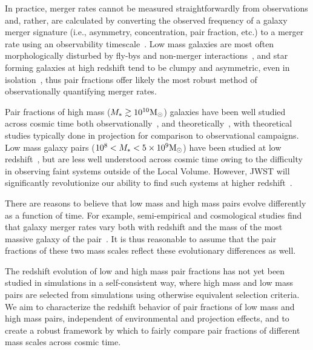 \documentclass[twocolumn]{aastex631}
\begin{document}
    In practice, merger rates cannot be measured straightforwardly from observations and, rather, are calculated by converting the observed frequency of a galaxy merger signature (i.e., asymmetry, concentration, pair fraction, etc.) to a merger rate using an observability timescale~\citep[e.g.][]{lotz11}. 
    Low mass galaxies are most often morphologically disturbed by fly-bys and non-merger interactions~\citep{Martin2021}, and star forming galaxies at high redshift tend to be clumpy and asymmetric, even in isolation~\citep{Wuyts2013}, thus pair fractions offer likely the most robust method of observationally quantifying merger rates. 

    Pair fractions of high mass ($M_*\gtrsim10^{10}\mathrm{M}_\odot$) galaxies have been well studied across cosmic time both observationally~\citep[e.g.][]{Patton2000,lotz11,Ferreras2014, Man2016,Duncan2019}, and theoretically~\citep[e.g.][]{rg15,snyder2017,snyder2023}, with theoretical studies typically done in projection for comparison to observational campaigns. 
    Low mass galaxy pairs ($10^8<M_*<5\times10^9\mathrm{M}_\odot$) have been studied at low redshift~\citep[e.g.][]{stierwalt15,pearson16,Besla2018,Paudel2018,Luber2022},
    but are less well understood across cosmic time owing to the difficulty in observing faint systems outside of the Local Volume. 
    However, JWST will significantly revolutionize our ability to find such systems at higher redshift~\citep{Behroozi2020}.
    
    There are reasons to believe that low mass and high mass pairs evolve differently as a function of time.
    For example, semi-empirical and cosmological studies find that galaxy merger rates vary both with redshift and the mass of the most massive galaxy of the pair~\citep[see e.g.][]{Stewart2009,Hopkins2010,rg15}.
    It is thus reasonable to assume that the pair fractions of these two mass scales reflect these evolutionary differences as well. 
    
    The redshift evolution of low and high mass pair fractions has not yet been studied in simulations in a self-consistent way, where high mass and low mass pairs are selected from simulations using otherwise equivalent selection criteria. 
    We aim to characterize the redshift behavior of pair fractions of low mass and high mass pairs, independent of environmental and projection effects, and to create a robust framework by which to fairly compare pair fractions of different mass scales across cosmic time. 
    
\end{document}
